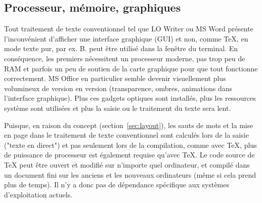 \documentclass[11pt,a4paper,ngerman,french,DIV=8]{scrartcl}
\begin{document}
\subsection{Processeur, mémoire, graphiques}

Tout traitement de texte conventionnel tel que LO Writer ou MS Word présente l'inconvénient d'afficher une interface graphique (GUI) et non, comme \TeX{}, en mode texte pur, par ex. B. peut être utilisé dans la fenêtre du terminal. En conséquence, les premiers nécessitent un processeur moderne, pas trop peu de RAM et parfois un peu de soutien de la carte graphique pour que tout fonctionne correctement. MS Office en particulier semble devenir visuellement plus volumineux de version en version (transparence, ombres, animations dans l'interface graphique). Plus ces gadgets optiques sont installés, plus les ressources système sont utilisées et plus la saisie ou le traitement du texte sera lent.

Puisque, en raison du concept (section~\ref{sec:layout}), les sauts de mots et la mise en page dans le traitement de texte conventionnel sont calculés lors de la saisie ("texte en direct") et pas seulement lors de la compilation, comme avec \TeX{}, plus de puissance de processeur est également requise qu'avec \TeX{}. Le code source de \TeX{} peut être ouvert et modifié sur n'importe quel ordinateur, et compilé dans un document fini sur les anciens et les nouveaux ordinateurs (même si cela prend plus de temps). Il n’y a donc pas de dépendance spécifique aux systèmes d’exploitation actuels.
\end{document}

